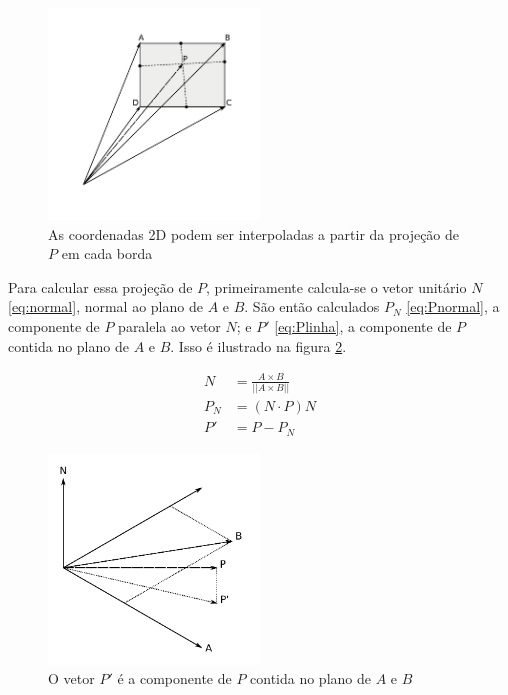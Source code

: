 \documentclass[brazil,pagestart=firstchapter]{abnt}
\begin{document}
\begin{figure}[h]
\centering
\includegraphics[width=0.5\textwidth]{img/geometria_ABCD2.pdf}
\caption{As coordenadas 2D podem ser interpoladas a partir da projeção de
$P$ em cada borda}
\label{fig:geometria_ABCD2}
\end{figure}

Para calcular essa projeção de $P$, primeiramente calcula-se o vetor
unitário $N$ \eqref{eq:normal}, normal ao plano de $A$ e $B$. São então
calculados $P_N$ \eqref{eq:Pnormal}, a componente de $P$ paralela ao vetor
$N$; e $P'$ \eqref{eq:Plinha}, a componente de $P$ contida no plano de $A$ e
$B$. Isso é ilustrado na figura \ref{fig:geometria_ABCD3}.

\begin{align}
\label{eq:normal}
N   & = \frac{A \times B}{ || A \times B || }   \\
\label{eq:Pnormal}
P_N & = (N \cdot P) N                           \\
\label{eq:Plinha}
P'  & = P - P_N
\end{align}

\begin{figure}[h]
\centering
\includegraphics[width=0.5\textwidth]{img/geometria_ABCD3.pdf}
\caption{O vetor $P'$ é a componente de $P$ contida no plano de $A$ e $B$}
\label{fig:geometria_ABCD3}
\end{figure}
\end{document}
